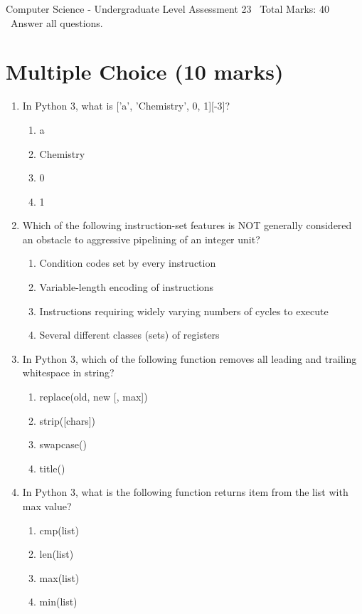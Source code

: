 \documentclass[12pt]{article}
\begin{document}
\begin{center}
Computer Science - Undergraduate Level Assessment 23 \
Total Marks: 40 \
Answer all questions.
\end{center}

\section*{Multiple Choice (10 marks)}
\begin{enumerate}[label=\arabic*.]
\item In Python 3, what is ['a', 'Chemistry', 0, 1][-3]?
\begin{enumerate}[label=(\alph*)]
    \item a
    \item Chemistry
    \item 0
    \item 1
\end{enumerate}
\item Which of the following instruction-set features is NOT generally considered an obstacle to aggressive pipelining of an integer unit?
\begin{enumerate}[label=(\alph*)]
    \item Condition codes set by every instruction
    \item Variable-length encoding of instructions
    \item Instructions requiring widely varying numbers of cycles to execute
    \item Several different classes (sets) of registers
\end{enumerate}
\item In Python 3, which of the following function removes all leading and trailing whitespace in string?
\begin{enumerate}[label=(\alph*)]
    \item replace(old, new [, max])
    \item strip([chars])
    \item swapcase()
    \item title()
\end{enumerate}
\item In Python 3, what is the following function returns item from the list with max value?
\begin{enumerate}[label=(\alph*)]
    \item cmp(list)
    \item len(list)
    \item max(list)
    \item min(list)

\end{enumerate}
\end{enumerate}
\end{document}
